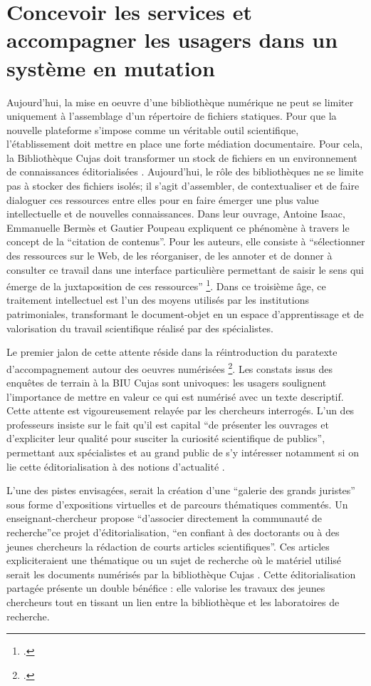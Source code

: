 \section[Conception et accompagnement]{Concevoir les services et accompagner les usagers dans un système en mutation}
Aujourd'hui, la mise en oeuvre d'une bibliothèque numérique ne peut se limiter uniquement à l'assemblage d'un répertoire de fichiers statiques. Pour que la nouvelle plateforme s'impose comme un véritable outil scientifique, l'établissement doit mettre en place une forte médiation documentaire. Pour cela, la Bibliothèque Cujas doit transformer un stock de fichiers en un environnement de connaissances éditorialisées . Aujourd'hui, le rôle des bibliothèques ne se limite pas à stocker des fichiers isolés; il s'agit d'assembler, de contextualiser et de faire dialoguer ces ressources entre elles pour en faire émerger une plus value intellectuelle et de nouvelles connaissances. Dans leur ouvrage, Antoine Isaac, Emmanuelle Bermès et Gautier Poupeau expliquent ce phénomène à travers le concept de la \enquote{citation de contenus}. Pour les auteurs, elle consiste à \enquote{sélectionner des ressources sur le Web, de les réorganiser, de les annoter et de donner à consulter ce travail dans une interface particulière permettant de saisir le sens qui émerge de la juxtaposition de ces ressources} \footcite{bermesWebSemantiqueBibliotheque2013}. Dans ce troisième âge, ce traitement intellectuel est l'un des moyens utilisés par les institutions patrimoniales, transformant le document-objet en un espace d'apprentissage et de valorisation du travail scientifique réalisé par des spécialistes. 

Le premier jalon de cette attente réside dans la réintroduction du paratexte d'accompagnement autour des oeuvres numérisées \footcite{salaunVuLuSu}. Les constats issus des enquêtes de terrain à la \ac{BIU Cujas} sont univoques: les usagers soulignent l'importance de mettre en valeur ce qui est numérisé avec un texte descriptif. Cette attente est vigoureusement relayée par les chercheurs interrogés. L'un des professeurs insiste sur le fait qu'il est capital \enquote{de présenter les ouvrages et d'expliciter leur qualité pour susciter la curiosité scientifique de publics}, permettant aux spécialistes et au grand public de s'y intéresser notamment si on lie cette éditorialisation à des notions d'actualité .

L'une des pistes envisagées, serait la création d'une \enquote{galerie des grands juristes} sous forme d'expositions virtuelles et de parcours thématiques commentés. Un enseignant-chercheur propose \enquote{d'associer directement la communauté de recherche}ce projet d'éditorialisation, \enquote{en confiant à des doctorants ou à des jeunes chercheurs la rédaction de courts articles scientifiques}. Ces articles expliciteraient une thématique ou un sujet de recherche où le matériel utilisé serait les documents numérisés par la bibliothèque Cujas . Cette éditorialisation partagée présente un double bénéfice : elle valorise les travaux des jeunes chercheurs tout en tissant un lien entre la bibliothèque et les laboratoires de recherche.

